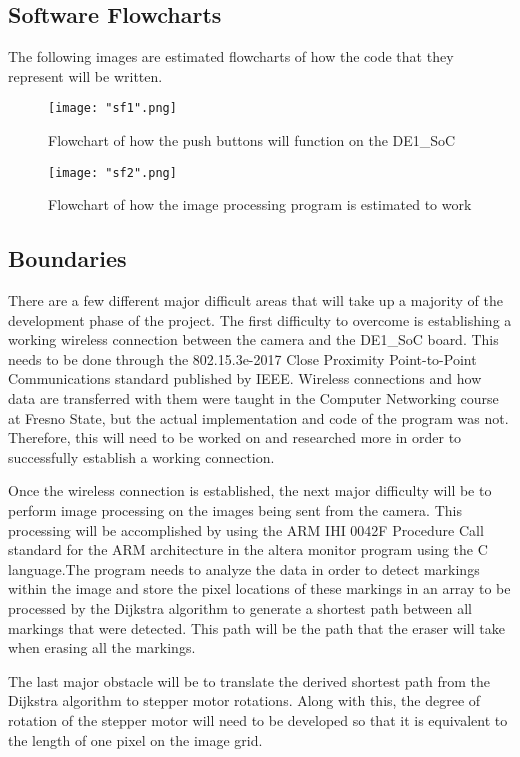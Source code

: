 \subsection{Software Flowcharts}

The following images are estimated flowcharts of how the code that they represent will be written.

\begin{figure}[H]
	\centering
	{\texttt{[image: "sf1".png]}}
	\caption{ Flowchart of how the push buttons will function on the DE1\_SoC
		\cite{smdataR}}
	\label{fig:sf1}
\end{figure}

\begin{figure}[H]
	\centering
	{\texttt{[image: "sf2".png]}}
	\caption{ Flowchart of how the image processing program is estimated to work
		\cite{smdataR}}
	\label{fig:sf2}
\end{figure}

\subsection{Boundaries}


\setlength{\parindent}{2.5ex} There are a few different major difficult areas that will take up a majority of the development phase of the project. The first difficulty to overcome is establishing a working wireless connection between the camera and the DE1\_SoC board. This needs to be done through the 802.15.3e-2017 Close Proximity Point-to-Point Communications standard published by IEEE. Wireless connections and how data are transferred with them were taught in the Computer Networking course at Fresno State, but the actual implementation and code of the program was not. Therefore, this will need to be worked on and researched more in order to successfully establish a working connection.\par
\setlength{\parindent}{2.5ex}
Once the wireless connection is established, the next major difficulty will be to perform image processing on the images being sent from the camera. This processing will be accomplished by using the ARM IHI 0042F Procedure Call standard for the ARM architecture in the altera monitor program using the C language.The program needs to analyze the data in order to detect markings within the image and store the pixel locations of these markings in an array to be processed by the Dijkstra algorithm to generate a shortest path between all markings that were detected. This path will be the path that the eraser will take when erasing all the markings.\par
\setlength{\parindent}{2.5ex}
The last major obstacle will be to translate the derived shortest path from the Dijkstra algorithm to stepper motor rotations. Along with this, the degree of rotation of the stepper motor will need to be developed so that it is equivalent to the length of one pixel on the image grid. \\

